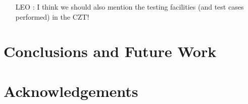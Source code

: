 \documentclass{llncs}
\begin{document}
    \begin{itemize}
        \item[LEO]: I think we should also mention the testing facilities (and test cases performed) in the CZT!
    \end{itemize}

\section{Conclusions and Future Work} \label{sec:conclusions}

\section*{Acknowledgements}



\end{document}
